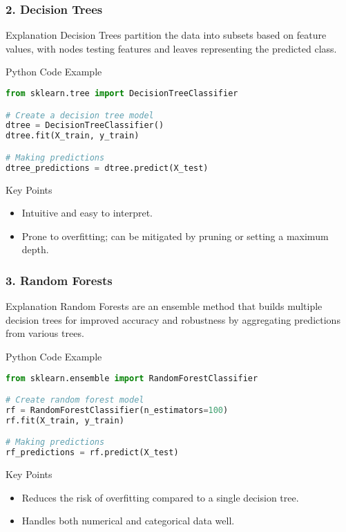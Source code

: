 \documentclass[aspectratio=169]{beamer}
\begin{document}
\begin{frame}[fragile]
    \frametitle{2. Decision Trees}
    \begin{block}{Explanation}
        Decision Trees partition the data into subsets based on feature values, with nodes testing features and leaves representing the predicted class.
    \end{block}

    \begin{block}{Python Code Example}
        \begin{lstlisting}[language=Python]
from sklearn.tree import DecisionTreeClassifier

# Create a decision tree model
dtree = DecisionTreeClassifier()
dtree.fit(X_train, y_train)

# Making predictions
dtree_predictions = dtree.predict(X_test)
        \end{lstlisting}
    \end{block}
    \begin{block}{Key Points}
        \begin{itemize}
            \item Intuitive and easy to interpret.
            \item Prone to overfitting; can be mitigated by pruning or setting a maximum depth.
        \end{itemize}
    \end{block}
\end{frame}

\begin{frame}[fragile]
    \frametitle{3. Random Forests}
    \begin{block}{Explanation}
        Random Forests are an ensemble method that builds multiple decision trees for improved accuracy and robustness by aggregating predictions from various trees.
    \end{block}

    \begin{block}{Python Code Example}
        \begin{lstlisting}[language=Python]
from sklearn.ensemble import RandomForestClassifier

# Create random forest model
rf = RandomForestClassifier(n_estimators=100)
rf.fit(X_train, y_train)

# Making predictions
rf_predictions = rf.predict(X_test)
        \end{lstlisting}
    \end{block}
    \begin{block}{Key Points}
        \begin{itemize}
            \item Reduces the risk of overfitting compared to a single decision tree.
            \item Handles both numerical and categorical data well.
        \end{itemize}
    \end{block}
\end{frame}
\end{document}
